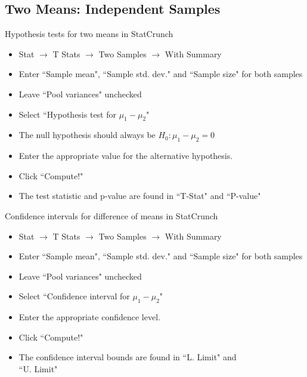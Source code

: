 \documentclass[xcolor=table]{beamer}
\begin{document}
\subsection{Two Means: Independent Samples}


\begin{frame}{Hypothesis tests for two means in StatCrunch}

\begin{block}{}
\large
\begin{itemize}
\item Stat $\to$ T Stats $\to$ Two Samples $\to$ With Summary
\item Enter ``Sample mean", ``Sample std. dev." and ``Sample size" for both samples
\item Leave ``Pool variances" unchecked
\item Select ``Hypothesis test for $\mu_1 - \mu_2$"
\item The null hypothesis should always be $H_0: \mu_1 - \mu_2 = 0$
\item Enter the appropriate value for the alternative hypothesis.
\item Click ``Compute!"
\item The test statistic and p-value are found in ``T-Stat" and ``P-value"
\end{itemize}
\end{block}

\end{frame}

\begin{frame}{Confidence intervals for difference of means in StatCrunch}

\begin{block}{}
\large
\begin{itemize}
\item Stat $\to$ T Stats $\to$ Two Samples $\to$ With Summary
\item Enter ``Sample mean", ``Sample std. dev." and ``Sample size" for both samples
\item Leave ``Pool variances" unchecked
\item Select ``Confidence interval for $\mu_1 - \mu_2$"
\item Enter the appropriate confidence level.
\item Click ``Compute!"
\item The confidence interval bounds are found in ``L. Limit" and\\ ``U. Limit"
\end{itemize}
\end{block}

\end{frame}
\end{document}
